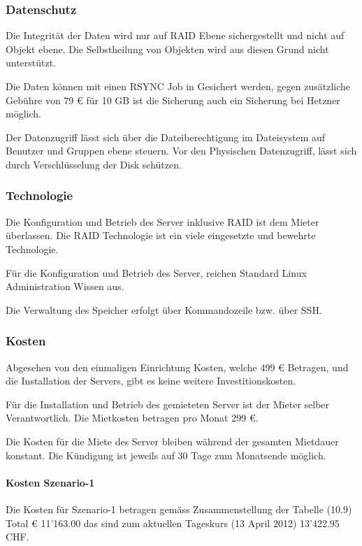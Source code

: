 \subsubsection*{Datenschutz}
Die Integrität der Daten wird nur auf RAID Ebene sichergestellt und nicht auf Objekt ebene. Die Selbstheilung von Objekten wird aus diesen Grund nicht unterstützt.

Die Daten können mit einen RSYNC Job in Gesichert werden, gegen zusätzliche Gebühre von 79 € für 10 GB ist die Sicherung auch ein Sicherung bei Hetzner möglich.

Der Datenzugriff lässt sich über die Dateiberechtigung im Dateisystem auf Benutzer und Gruppen ebene steuern. Vor den Physischen Datenzugriff, lässt sich durch Verschlüsselung der Disk schützen.

\subsubsection*{Technologie}
Die Konfiguration und Betrieb des Server inklusive RAID ist dem Mieter überlassen. Die RAID Technologie ist ein viele eingesetzte und bewehrte Technologie.

Für die Konfiguration und Betrieb des Server, reichen Standard Linux Administration Wissen aus.

Die Verwaltung des Speicher erfolgt über Kommandozeile bzw. über \gls{SSH}.

\subsubsection*{Kosten}
Abgesehen von den einmaligen Einrichtung Kosten, welche 499 € Betragen, und die Installation der Servers, gibt es keine weitere Investitionskosten. 

Für die Installation und Betrieb des gemieteten Server ist der Mieter selber Verantwortlich. Die Mietkosten betragen pro Monat 299 €.

Die Kosten für die Miete des Server bleiben während der gesamten Mietdauer konstant. Die Kündigung ist jeweils auf 30 Tage zum Monatsende möglich. 

\paragraph*{Kosten Szenario-1}
Die Kosten für Szenario-1 betragen gemäss Zusammenstellung der Tabelle (10.9) Total € 11'163.00 das sind zum aktuellen Tageskurs (13 April 2012) 13'422.95 CHF.

